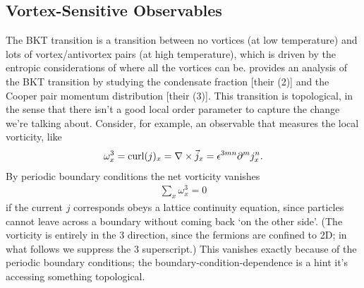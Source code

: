 \subsection{Vortex-Sensitive Observables}\label{sec:vortex}

The BKT transition is a transition between no vortices (at low temperature) and lots of vortex/antivortex pairs (at high temperature), which is driven by the entropic considerations of where all the vortices can be.
 provides an analysis of the BKT transition by studying the condensate fraction [their (2)] and the Cooper pair momentum distribution [their (3)].
This transition is topological, in the sense that there isn't a good local order parameter to capture the change we're talking about.
Consider, for example, an observable that measures the local vorticity, like
\begin{align}
	\omega^3_x = \text{curl}(j)_x = \nabla \times \vec{j}_x = \epsilon^{3mn} \partial^m j^n_x.
\end{align}
By periodic boundary conditions the net vorticity vanishes
\begin{align}
	\sum_x \omega^3_x = 0
	\label{eq:net vorticity}
\end{align}
if the current $j$ corresponds obeys a lattice continuity equation, since particles cannot leave across a boundary without coming back `on the other side'.
(The vorticity is entirely in the 3 direction, since the fermions are confined to 2D; in what follows we suppress the 3 superscript.)
This vanishes exactly because of the periodic boundary conditions; the boundary-condition-dependence is a hint it's accessing something topological.

